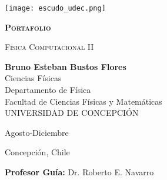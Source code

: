 \documentclass[../portafolio.tex]{subfiles}
\begin{document}


\begin{titlepage}


  \thispagestyle{frontpage}

  \begin{center}

    \texttt{[image: escudo\_udec.png]}


    \vspace*{3\baselineskip}

      \textsc{\Huge \textbf{Portafolio}}
      \vspace*{1.5\baselineskip}

      \textsc{\huge Física Computacional II}\\ %

      \vspace*{4\baselineskip}

      \large{\textbf{Bruno Esteban Bustos Flores}}\\

      \large{Ciencias Físicas \\
        Departamento de Física \\
        Facultad de Ciencias Físicas y Matemáticas\\
        UNIVERSIDAD DE CONCEPCIÓN}


    \vspace{4\baselineskip}

    Agosto-Diciembre \the\year

    \vspace{0.1\baselineskip}

    Concepción, Chile

    \vspace{1.5\baselineskip}

    \large{\textbf{Profesor Guía:} Dr. Roberto E. Navarro}\\

  \end{center}

  \vspace*{4\baselineskip}


\end{titlepage}
\end{document}
